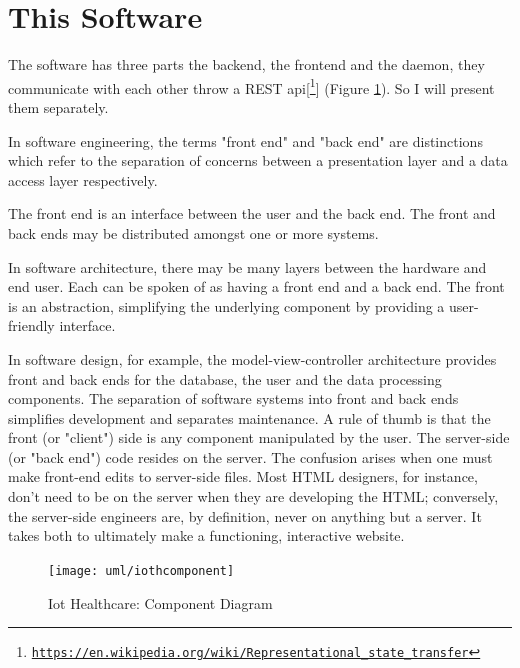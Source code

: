 \section*{This Software}

The software has three parts the backend, the frontend and the daemon, they communicate with each other throw a REST api[\footnote{\href{https://en.wikipedia.org/wiki/Representational\_state\_transfer}{\texttt{https://en.wikipedia.org/wiki/Representational\_state\_transfer}}}] (Figure \ref{fig:iothcomponentdiagram5}). So I will present them separately. 
\newline

In software engineering, the terms "front end" and "back end" are distinctions which refer to the separation of concerns between a presentation layer and a data access layer respectively.
\newline

The front end is an interface between the user and the back end. The front and back ends may be distributed amongst one or more systems.
\newline

In software architecture, there may be many layers between the hardware and end user. Each can be spoken of as having a front end and a back end. The front is an abstraction, simplifying the underlying component by providing a user-friendly interface.
\newline

In software design, for example, the model-view-controller architecture provides front and back ends for the database, the user and the data processing components. The separation of software systems into front and back ends simplifies development and separates maintenance. A rule of thumb is that the front (or "client") side is any component manipulated by the user. The server-side (or "back end") code resides on the server. The confusion arises when one must make front-end edits to server-side files. Most HTML designers, for instance, don't need to be on the server when they are developing the HTML; conversely, the server-side engineers are, by definition, never on anything but a server. It takes both to ultimately make a functioning, interactive website.

\begin{figure}[h]
	\centering
	\texttt{[image: uml/iothcomponent]}
	\caption{Iot Healthcare: Component Diagram}
	\label{fig:iothcomponentdiagram5}
\end{figure}

